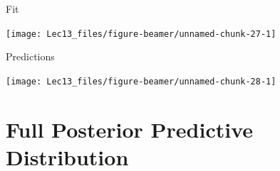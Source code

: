 \documentclass[11pt,ignorenonframetext,]{beamer}
\begin{document}
\begin{frame}{Fit}
\protect\hypertarget{fit}{}

\begin{center}\texttt{[image: Lec13\_files/figure-beamer/unnamed-chunk-27-1]} \end{center}

\end{frame}

\begin{frame}{Predictions}
\protect\hypertarget{predictions}{}

\begin{center}\texttt{[image: Lec13\_files/figure-beamer/unnamed-chunk-28-1]} \end{center}

\end{frame}

\hypertarget{full-posterior-predictive-distribution}{%
\section{Full Posterior Predictive
Distribution}\label{full-posterior-predictive-distribution}}
\end{document}
